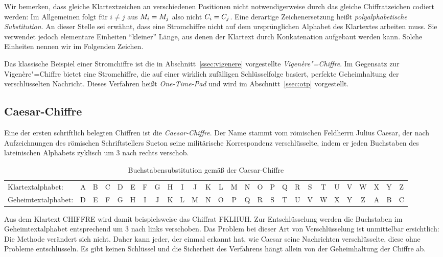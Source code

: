 Wir bemerken, dass gleiche Klartextzeichen an verschiedenen Positionen nicht notwendigerweise durch das gleiche Chiffratzeichen codiert werden: Im Allgemeinen folgt für $i \ne j$ aus $M_i = M_j$ also nicht $C_i = C_j$. Eine derartige Zeichenersetzung heißt \emph{polyalphabetische Substitution}. An dieser Stelle sei erwähnt, dass eine Stromchiffre nicht auf dem ursprünglichen Alphabet des Klartextes arbeiten muss. Sie verwendet jedoch elementare Einheiten "`kleiner"' Länge, aus denen der Klartext durch Konkatenation aufgebaut werden kann. Solche Einheiten nennen wir im Folgenden Zeichen.

Das klassische Beispiel einer Stromchiffre ist die in Abschnitt~\ref{ssec:vigenere} vorgestellte \emph{Vigenère"=Chiffre}. Im Gegensatz zur Vigenère"=Chiffre bietet eine Stromchiffre, die auf einer wirklich zufälligen Schlüsselfolge basiert, perfekte Geheimhaltung der verschlüsselten Nachricht. Dieses Verfahren heißt \emph{One-Time-Pad} und wird im Abschnitt~\ref{ssec:otp} vorgestellt.

\subsection{Caesar-Chiffre}
Eine der ersten schriftlich belegten Chiffren ist die \emph{Caesar-Chiffre}. Der Name stammt vom römischen Feldherrn Julius Caesar, der nach Aufzeichnungen des römischen Schriftstellers Sueton seine militärische Korrespondenz verschlüsselte, indem er jeden Buchstaben des lateinischen Alphabets zyklisch um 3 nach rechts verschob.
\begin{table}[h]
	\centering
	\setlength{\tabcolsep}{2pt}
	\begin{tabular}{l*{26}{c}}
		Klartextalphabet: &A&B&C&D&E&F&G&H&I&J&K&L&M&N&O&P&Q&R&S&T&U&V&W&X&Y&Z\\
		Geheimtextalphabet: &D&E&F&G&H&I&J&K&L&M&N&O&P&Q&R&S&T&U&V&W&X&Y&Z&A&B&C\\
	\end{tabular}
	\caption{Buchstabensubstitution gemäß der Caesar-Chiffre}
\end{table}

Aus dem Klartext \glqq CHIFFRE\grqq{} wird damit beispielsweise das Chiffrat \glqq FKLIIUH\grqq. Zur Entschlüsselung werden die Buchstaben im Geheimtextalphabet entsprechend um 3 nach links verschoben. Das Problem bei dieser Art von Verschlüsselung ist unmittelbar ersichtlich: Die Methode verändert sich nicht. Daher kann jeder, der einmal erkannt hat, wie Caesar seine Nachrichten verschlüsselte, diese ohne Probleme entschlüsseln. Es gibt keinen Schlüssel und die Sicherheit des Verfahrens hängt allein von der Geheimhaltung der Chiffre ab.

